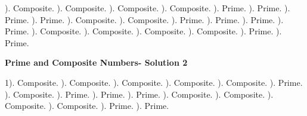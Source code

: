\documentclass{article}%
\begin{document}
). Composite.%
). Composite.%
). Composite.%
). Composite.%
). Prime.%
). Prime.%
). Prime.%
). Prime.%
). Composite.%
). Composite.%
). Prime.%
). Prime.%
). Prime.%
). Prime.%
). Composite.%
). Composite.%
). Composite.%
). Composite.%
). Prime.%
). Prime.%
\newline%
\newpage%
\large%
\begin{center}%
\textbf{Prime and Composite Numbers- Solution 2}%
\newline%
\end{center} \normalsize%
1). Composite.%
). Composite.%
). Composite.%
). Composite.%
). Composite.%
). Prime.%
). Composite.%
). Prime.%
). Prime.%
). Prime.%
). Composite.%
). Composite.%
). Composite.%
). Composite.%
). Prime.%
). Prime.%
\newline%
\end{document}
